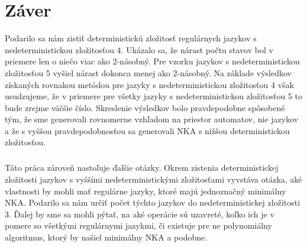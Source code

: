 \chapter{Záver}

Podarilo sa nám zistiť deterministickú zložitosť regulárnych jazykov s nedeterministickou zložitosťou 4. Ukázalo sa, že nárast počtu stavov bol v priemere len o niečo viac ako 2-násobný. Pre vzorku jazykov s nedeterministickou zložitosťou 5 vyšiel nárast dokonca menej ako 2-násobný. Na základe výsledkov získaných rovnakou metódou pre jazyky s nedeterministickou zložitosťou 4 však usudzujeme, že v priemere pre všetky jazyky s nedeterministickou zložitosťou 5 to bude zrejme väčšie číslo. Skreslenie výsledkov bolo pravdepodobne spôsobené tým, že sme generovali rovnomerne vzhľadom na priestor automatov, nie jazykov a že s vyššou pravdepodobnosťou sa generovali NKA s nižšou deterministickou zložitosťou.

\paragraph{}
Táto práca zároveň nastoľuje ďalšie otázky. Okrem zistenia deterministickej zložitosti jazykov s vyššími nedeterministickými zložitosťami vyvstáva otázka, aké vlastnosti by mohli mať regulárne jazyky, ktoré majú jednoznačný minimálny NKA. Podarilo sa nám určiť počet týchto jazykov do nedeterministickej zložitosti 3. Ďalej  by sme sa mohli pýtať, na aké operácie sú uzavreté, koľko ich je v pomere so všetkými regulárnymi jazykmi, či existuje pre ne polynomiálny algoritmus, ktorý by našiel minimálny NKA a podobne.